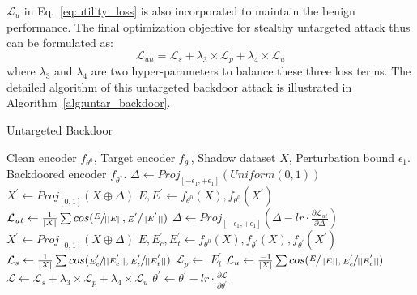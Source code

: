 $\mathcal{L}_{u}$ in Eq.~\ref{eq:utility_loss} is also incorporated to maintain the benign performance. The final optimization objective for stealthy untargeted attack thus can be formulated as:
\begin{equation}
    \mathcal{L}_{un}=\mathcal{L}_{s} + \lambda_3 \times \mathcal{L}_{p} +\lambda_4 \times \mathcal{L}_{u}
\end{equation}
where $\lambda_3$ and $\lambda_4$ are two hyper-parameters to balance these three loss terms. The detailed algorithm of this untargeted backdoor attack is illustrated in Algorithm~\ref{alg:untar_backdoor}.
\begin{algorithm}[H]
   \caption{Untargeted Backdoor}
   \label{alg:untar_backdoor}
\begin{algorithmic}[1]
\fontsize{8.5}{11}\selectfont
    Clean encoder $f_{\theta^0}$, Target encoder $f_{\theta^{'}}$, Shadow dataset $X$, Perturbation bound $\epsilon_1$.
    Backdoored encoder $f_{\theta^*}$.
       \STATE $\varDelta \gets Proj_{[-\epsilon_1, +\epsilon_1]}(Uniform(0, 1))$
       \STATE $X^{'} \gets Proj_{[0, 1]} (X \oplus \varDelta)$
       \STATE $E, E^{'} \gets f_{\theta^0}(X), f_{\theta^0}(X^{'})$
       \STATE $\mathcal{L}_{ut} \gets \frac{1}{|X|} \sum cos(\sfrac{E}{||E||}, \sfrac{E^{'}}{||E^{'}||})$
       \STATE $\varDelta \gets Proj_{[-\epsilon_1, +\epsilon_1]} (\varDelta - lr \cdot \frac{\partial \mathcal{L}_{ut}}{\partial \varDelta})$
       \ENDFOR
       \STATE $X^{'} \gets Proj_{[0, 1]} (X \oplus \varDelta)$
       \STATE $E, E_c^{'}, E_t^{'} \gets f_{\theta^0}(X), f_{\theta^{'}}(X), f_{\theta^{'}}(X^{'})$
       \STATE $\mathcal{L}_{s} \gets \frac{1}{|X|} \sum cos(\sfrac{E_c^{'}}{||E_c^{'}||}, \sfrac{E_t^{'}}{||E_t^{'}||})$
       \STATE $\mathcal{L}_{p} \gets$  $E_t^{'}$
       \STATE $\mathcal{L}_{u} \gets \frac{-1}{|X|} \sum cos(\sfrac{E}{||E||}, \sfrac{E_c^{'}}{||E_c^{'}||})$
       \STATE $\mathcal{L} \gets \mathcal{L}_{s} + \lambda_3 \times \mathcal{L}_{p} + \lambda_4 \times \mathcal{L}_{u}$
        \STATE $\theta^{'} \gets \theta^{'} - lr \cdot \frac{\partial \mathcal{L}}{\partial \theta^{'}}$
       \ENDFOR
   \ENDFUNCTION
\end{algorithmic}
\end{algorithm}
